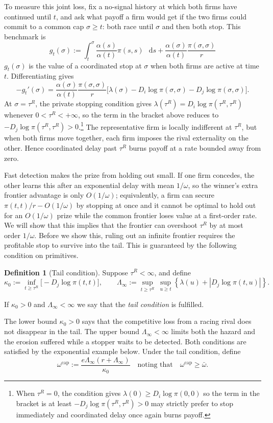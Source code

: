 \documentclass[12pt,reqno]{article}
\newcommand{\de}{\mathop{}\!\mathrm{d}}
\theoremstyle{definition} \newtheorem{example}{Example}
\theoremstyle{definition} \newtheorem{condition}{Condition}
\theoremstyle{definition} \newtheorem{corollary}{Corollary}
\theoremstyle{definition} \newtheorem{claim}{Claim}
\theoremstyle{definition} \newtheorem{definition}{Definition}
\theoremstyle{definition} \newtheorem{conjecture}{Conjecture}
\theoremstyle{definition} \newtheorem{Lemma}{Lemma}
\theoremstyle{definition} \newtheorem{lemma}{Lemma}
\theoremstyle{plain} \newtheorem{theorem}{Theorem}
\theoremstyle{definition} \newtheorem{assumption}{Assumption}
\theoremstyle{definition} \newtheorem*{assumptionnonumber}{Assumption}
\theoremstyle{definition} \newtheorem*{theoremNoNumber}{Proposition}
\theoremstyle{definition}
\theoremstyle{definition}\newtheorem{proposition}{Proposition}
\theoremstyle{definition} \newtheorem{result}{Result}
\theoremstyle{definition} \newtheorem*{definitionNoNumber}{Definition}
\theoremstyle{definition} \newtheorem{Definition}{Definition}
\theoremstyle{definition} \newtheorem*{DefinitionNoNumber}{Definition}
\theoremstyle{definition} \newtheorem*{fact}{Fact}
\theoremstyle{definition} \newtheorem*{property}{Property}
\theoremstyle{definition} \newtheorem{remark}{Remark}
\begin{document}
To measure this joint loss, fix a no-signal history at which both firms have continued until $t$, and ask what payoff a firm would get if the two firms could commit to a common cap $\sigma\ge t$: both race until $\sigma$ and then both stop. This benchmark is
\[
g_t(\sigma)
:=
\int_t^\sigma\frac{\alpha(s)}{\alpha(t)}\pi(s,s)\,\de s
+
\frac{\alpha(\sigma)}{\alpha(t)}\frac{\pi(\sigma,\sigma)}{r}
\tag{JOINT} \label{eq:joint_stop}
\]
$g_t(\sigma)$ is the value of a coordinated stop at $\sigma$ when both firms are active at time $t$.  Differentiating gives
\[
-g_t'(\sigma)
=
\frac{\alpha(\sigma)}{\alpha(t)}
\frac{\pi(\sigma,\sigma)}{r}
\Big[
\lambda(\sigma)
-D_i\log\pi(\sigma,\sigma)
-D_j\log\pi(\sigma,\sigma)
\Big].
\]
At $\sigma=\tau^R$, the private stopping condition gives
$\lambda(\tau^R)=D_i\log\pi(\tau^R,\tau^R)$ whenever $0 < \tau^R < +\infty$, so the term in the bracket above reduces to
$-D_j\log\pi(\tau^R,\tau^R)>0$.\footnote{When $\tau^R = 0$, the condition gives $\lambda(0)\ge D_i\log\pi(0,0)$ so the term in the bracket is at least $-D_j\log\pi(\tau^R,\tau^R)>0$ may strictly prefer to stop immediately and coordinated delay once again burns payoff.}  The representative firm is locally indifferent at $\tau^R$, but  when both firms move together, each firm imposes the rival externality on the other. Hence coordinated delay past $\tau^R$ burns payoff at a rate bounded away from zero.

Fast detection makes the prize from holding out small. If one firm concedes, the other learns this after an exponential delay with mean $1/\omega$, so the winner's extra frontier advantage is only $O(1/\omega)$; equivalently, a firm can secure $\pi(t,t)/r-O(1/\omega)$ by stopping at once and it cannot be optimal to hold out for an $O(1/\omega)$ prize while the common frontier loses value at a first-order rate. We will show that this implies that  the frontier can overshoot $\tau^R$ by at most order $1/\omega$. Before we show this, ruling out an infinite frontier requires the profitable stop to survive into the tail. This is guaranteed by the following condition on primitives.


\begin{definition}[Tail condition]
\label{cond:uniform-tail}
Suppose $\tau^R<\infty$, and define 
\[
\kappa_0
:=
\inf_{t\geq\tau^R}\big[-D_j\log\pi(t,t)\big],
\qquad
\Lambda_\infty
:=
\sup_{t\geq\tau^R}\ \sup_{u\geq t}
\left\{\lambda(u)+\left|D_j\log\pi(t,u)\right|\right\}.
\]

If $\kappa_0>0$ and
$\Lambda_\infty<\infty$ we say that the \emph{tail condition} is fulfilled.
\end{definition}
The lower bound $\kappa_0>0$ says that the competitive loss from a racing rival
does not disappear in the tail. The upper bound $\Lambda_\infty<\infty$ limits both
the hazard and the erosion suffered while a stopper waits to be detected. Both conditions are satisfied by the exponential example below. 
Under the tail condition, define
\[
\omega^{\mathrm{cap}}
:=
\frac{e\Lambda_\infty(r+\Lambda_\infty)}{\kappa_0} \quad \text{noting that} \quad \omega^{\mathrm{cap}} \geq \bar \omega.
\]
\end{document}
